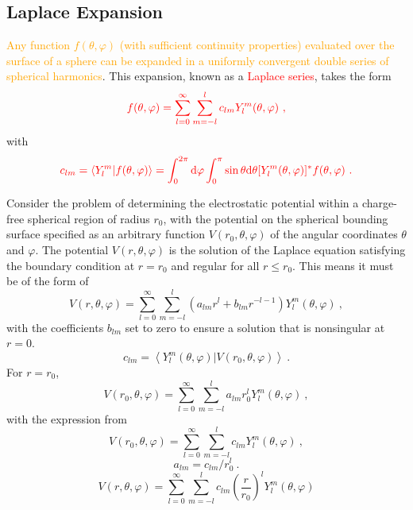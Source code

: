 \documentclass[12pt,a4paper]{article}
\newcommand{\dif}{\mathrm{d}}
\begin{document}
\subsection{Laplace Expansion}
\textcolor{orange}{Any function $f(\theta, \varphi)$ (with sufficient continuity properties) evaluated over the surface of a sphere can be expanded in a uniformly convergent double series of spherical harmonics}. This expansion, known as a \textcolor{red}{Laplace series}, takes the form
\begin{equation}
\color{red} f(\theta, \varphi) = \sum_{l = 0}^\infty \sum_{m = -l}^l c_{lm} Y_l^m(\theta, \varphi) ~,
\end{equation}
with
\begin{equation}
\color{red} c_{lm} = \langle Y_l^m | f(\theta, \varphi)\rangle = \int_0^{2\pi } \dif \varphi \int_0^\pi \sin \theta \dif \theta  [Y_{l}^{m}(\theta, \varphi)]^\ast f(\theta, \varphi) ~.
\end{equation}

Consider the problem of determining the electrostatic potential within a charge-free spherical region of radius $r_0$, with the potential on the spherical bounding surface specified as an arbitrary function $V(r_0,\theta,\varphi)$ of the angular coordinates $\theta$ and $\varphi$. The potential $V(r,\theta,\varphi)$ is the solution of the Laplace equation satisfying the boundary condition at $r = r_0$ and regular for all $r \leqslant r_0$. This means it must be of the form of
\begin{equation}
V(r,\theta,\varphi) = \sum_{l=0}^{\infty} \sum_{m=-l}^l \left(a_{lm} r^l +b_{lm} r^{-l -1}  \right) Y_l^m(\theta,\varphi) ~,
\end{equation}
with the coefficients $b_{lm}$ set to zero to ensure a solution that is nonsingular at $r = 0$.
\begin{equation}
c_{lm} = \left\langle Y_l^m (\theta,\varphi) | V(r_0,\theta,\varphi) \right \rangle ~.
\end{equation}
For $r = r_0$,
\begin{equation}
V(r_0,\theta,\varphi) = \sum_{l=0}^{\infty} \sum_{m=-l}^l a_{lm} r_0^l Y_l^m(\theta,\varphi) ~,
\end{equation}
with the expression from
\begin{equation}
V(r_0,\theta,\varphi) = \sum_{l=0}^{\infty} \sum_{m=-l}^l c_{lm} Y_l^m(\theta,\varphi) ~,
\end{equation}
\begin{equation}
a_{lm} = c_{lm}/ r_0^l ~.
\end{equation}
\begin{equation}
V(r,\theta,\varphi) = \sum_{l=0}^{\infty} \sum_{m=-l}^l c_{lm} \left(\dfrac{r}{r_0} \right)^l Y_l^m(\theta,\varphi) 
\end{equation}
\end{document}
